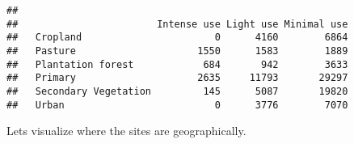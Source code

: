 \documentclass[
]{article}
\newenvironment{Shaded}{\begin{snugshade}}{\end{snugshade}}
\newcommand{\AttributeTok}[1]{\textcolor[rgb]{0.77,0.63,0.00}{#1}}
\newcommand{\FunctionTok}[1]{\textcolor[rgb]{0.00,0.00,0.00}{#1}}
\newcommand{\NormalTok}[1]{#1}
\newcommand{\SpecialCharTok}[1]{\textcolor[rgb]{0.00,0.00,0.00}{#1}}
\newcommand{\StringTok}[1]{\textcolor[rgb]{0.31,0.60,0.02}{#1}}
\begin{document}
\begin{Shaded}
\end{Shaded}

\begin{verbatim}
##                       
##                        Intense use Light use Minimal use
##   Cropland                       0      4160        6864
##   Pasture                     1550      1583        1889
##   Plantation forest            684       942        3633
##   Primary                     2635     11793       29297
##   Secondary Vegetation         145      5087       19820
##   Urban                          0      3776        7070
\end{verbatim}

Lets visualize where the sites are geographically.
\end{document}
